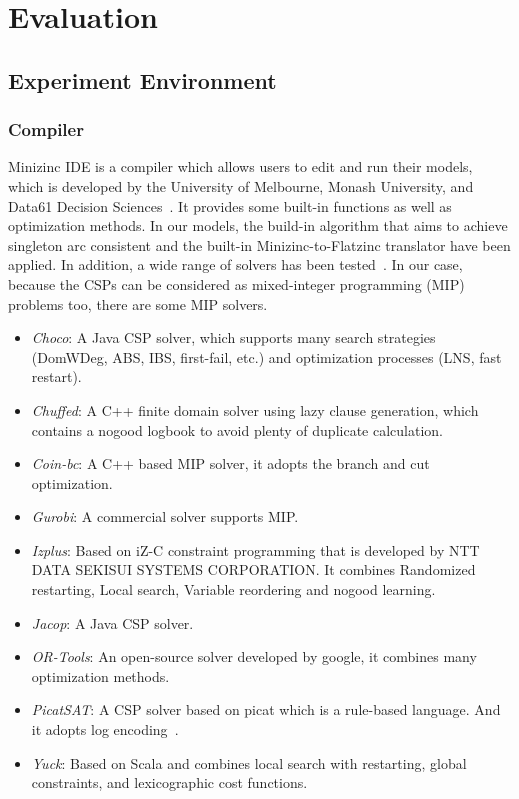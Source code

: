 \chapter{Evaluation}
\label{cha:evaluation}
\section{Experiment Environment}
\subsection{Compiler}
\label{section:compiler}
Minizinc IDE is a compiler which allows users to edit and run their models, which is developed by the University of Melbourne, Monash University, and Data61 Decision Sciences~\cite{r6}. It provides some built-in functions as well as optimization methods. In our models, the build-in algorithm that aims to achieve singleton arc consistent and the built-in Minizinc-to-Flatzinc translator have been applied. In addition, a wide range of solvers has been tested~\cite{r6}. In our case, because the CSPs can be considered as mixed-integer programming (MIP) problems too, there are some MIP solvers.
\begin{itemize}
    \item \emph{Choco}: A Java CSP solver, which supports many search strategies (DomWDeg, ABS, IBS, first-fail, etc.) and optimization processes (LNS, fast restart).
    \item \emph{Chuffed}: A C++ finite domain solver using lazy clause generation, which contains a nogood logbook to avoid plenty of duplicate calculation.
    \item \emph{Coin-bc}: A C++ based MIP solver, it adopts the branch and cut optimization.
    \item \emph{Gurobi}: A commercial solver supports MIP.
    \item \emph{Izplus}: Based on iZ-C constraint programming that is developed by NTT DATA SEKISUI SYSTEMS CORPORATION. It combines Randomized restarting, Local search, Variable reordering and nogood learning.
    \item \emph{Jacop}: A Java CSP solver.
    \item \emph{OR-Tools}: An open-source solver developed by google, it combines many optimization methods.
    \item \emph{PicatSAT}: A CSP solver based on picat which is a rule-based language. And it adopts log encoding~\cite{r8}.
    \item \emph{Yuck}: Based on Scala and combines local search with restarting, global constraints, and lexicographic cost functions.
\end{itemize}
